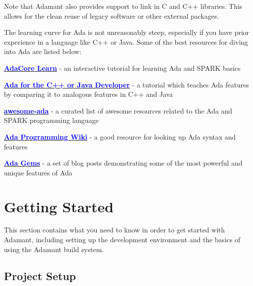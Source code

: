 Note that Adamant also provides support to link in C and C++ libraries. This allows for the clean reuse of legacy software or other external packages.

The learning curve for Ada is not unreasonably steep, especially if you have prior experience in a language like C++ or Java. Some of the best resources for diving into Ada are listed below:

\vspace{5mm} %
\begin{spaceditemize}
  \item \href{https://learn.adacore.com/index.html}{\textbf{\textcolor{blue}{AdaCore Learn}}} - an interactive tutorial for learning Ada and SPARK basics
  \item \href{https://learn.adacore.com/courses/Ada_For_The_CPP_Java_Developer/index.html}{\textbf{\textcolor{blue}{Ada for the C++ or Java Developer}}} - a tutorial which teaches Ada features by comparing it to analogous features in C++ and Java
  \item \href{https://github.com/ohenley/awesome-ada}{\textbf{\textcolor{blue}{awesome-ada}}} - a curated list of awesome resources related to the Ada and SPARK programming language
  \item \href{https://en.wikibooks.org/wiki/Ada_Programming}{\textbf{\textcolor{blue}{Ada Programming Wiki}}} - a good resource for looking up Ada syntax and features
  \item \href{https://www.adacore.com/gems/}{\textbf{\textcolor{blue}{Ada Gems}}} - a set of blog posts demonstrating some of the most powerful and unique features of Ada
\end{spaceditemize}
\vspace{5mm} %

\newpage
\section{Getting Started} \label{Getting Started}

This section contains what you need to know in order to get started with Adamant, including setting up the development environment and the basics of using the Adamant build system.

\subsection{Project Setup} \label{Project Setup}

